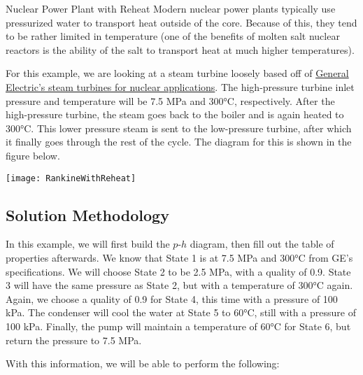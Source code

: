 \begin{example}[label=ex:RankineReheat]{Nuclear Power Plant with Reheat}
  Modern nuclear power plants typically use pressurized water to transport heat outside of the core.  Because of this, they tend to be rather limited in temperature (one of the benefits of molten salt nuclear reactors is the ability of the salt to transport heat at much higher temperatures).

  For this example, we are looking at a steam turbine loosely based off of \href{https://www.ge.com/steam-power/products/steam-turbines}{General Electric's  steam turbines for nuclear applications}.  The high-pressure turbine inlet pressure and temperature will be 7.5 MPa and 300°C, respectively.  After the high-pressure turbine, the steam goes back to the boiler and is again heated to 300°C.  This lower pressure steam is sent to the low-pressure turbine, after which it finally goes through the rest of the cycle.  The diagram for this is shown in the figure below.

  \begin{center}
    \texttt{[image: RankineWithReheat]}
  \end{center}
  \subsection*{Solution Methodology}
  In this example, we will first build the $p$-$h$ diagram, then fill out the table of properties afterwards.  We know that State 1 is at 7.5 MPa and 300°C from GE's specifications.  We will choose State 2 to be 2.5 MPa, with a quality of 0.9.  State 3 will have the same pressure as State 2, but with a temperature of 300°C again.  Again, we choose a quality of 0.9 for State 4, this time with a pressure of 100 kPa.  The condenser will cool the water at State 5 to 60°C, still with a pressure of 100 kPa.  Finally, the pump will maintain a temperature of 60°C for State 6, but return the pressure to 7.5 MPa.

  With this information, we will be able to perform the following:


\end{example}
